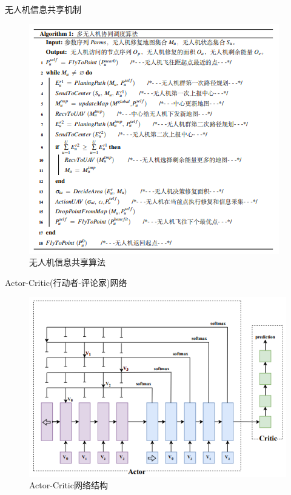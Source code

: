 \documentclass{beamer}
\begin{document}
\begin{frame}{无人机信息共享机制}

    \begin{figure}[htbp]
		  \centering
            \includegraphics[scale=0.9]{pic/5.png}
            \caption{无人机信息共享算法}
    \end{figure}
\end{frame}

\begin{frame}{Actor-Critic(行动者-评论家)网络}

    \begin{figure}[htbp]
		  \centering
            \includegraphics[scale=0.9]{pic/7.png}
            \caption{Actor-Critic网络结构}
    \end{figure}
\end{frame}
\end{document}
